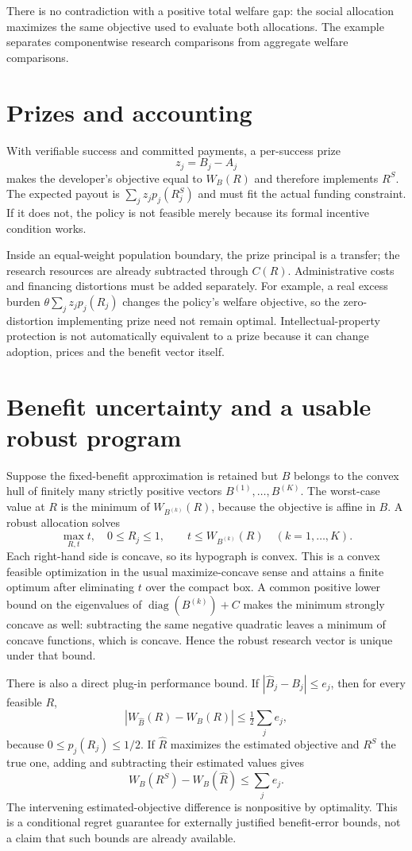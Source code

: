 \documentclass[11pt]{article}
\begin{document}
There is no contradiction with a positive total welfare gap: the social allocation maximizes the same objective used to evaluate both allocations. The example separates componentwise research comparisons from aggregate welfare comparisons.

\section*{Prizes and accounting}
With verifiable success and committed payments, a per-success prize
\[
 z_j=B_j-A_j
\]
makes the developer's objective equal to $W_B(R)$ and therefore implements $R^S$. The expected payout is $\sum_jz_jp_j(R_j^S)$ and must fit the actual funding constraint. If it does not, the policy is not feasible merely because its formal incentive condition works.

Inside an equal-weight population boundary, the prize principal is a transfer; the research resources are already subtracted through $C(R)$. Administrative costs and financing distortions must be added separately. For example, a real excess burden $\theta\sum_jz_jp_j(R_j)$ changes the policy's welfare objective, so the zero-distortion implementing prize need not remain optimal. Intellectual-property protection is not automatically equivalent to a prize because it can change adoption, prices and the benefit vector itself.

\section*{Benefit uncertainty and a usable robust program}
Suppose the fixed-benefit approximation is retained but $B$ belongs to the convex hull of finitely many strictly positive vectors $B^{(1)},\ldots,B^{(K)}$. The worst-case value at $R$ is the minimum of $W_{B^{(k)}}(R)$, because the objective is affine in $B$. A robust allocation solves
\[
 \max_{R,t}t,\quad 0\leq R_j\leq1,\qquad
 t\leq W_{B^{(k)}}(R)\quad(k=1,\ldots,K).
\]
Each right-hand side is concave, so its hypograph is convex. This is a convex feasible optimization in the usual maximize-concave sense and attains a finite optimum after eliminating $t$ over the compact box. A common positive lower bound on the eigenvalues of $\operatorname{diag}(B^{(k)})+C$ makes the minimum strongly concave as well: subtracting the same negative quadratic leaves a minimum of concave functions, which is concave. Hence the robust research vector is unique under that bound.

There is also a direct plug-in performance bound. If $|\widehat B_j-B_j|\leq e_j$, then for every feasible $R$,
\[
 |W_{\widehat B}(R)-W_B(R)|\leq\tfrac12\sum_je_j,
\]
because $0\leq p_j(R_j)\leq1/2$. If $\widehat R$ maximizes the estimated objective and $R^S$ the true one, adding and subtracting their estimated values gives
\[
 W_B(R^S)-W_B(\widehat R)\leq\sum_je_j.
\]
The intervening estimated-objective difference is nonpositive by optimality. This is a conditional regret guarantee for externally justified benefit-error bounds, not a claim that such bounds are already available.
\end{document}
